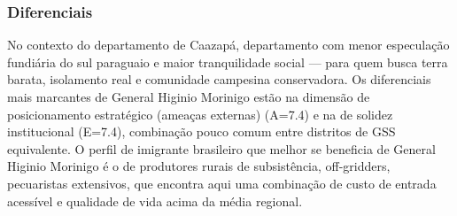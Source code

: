 \subsubsection*{Diferenciais}\label{dif-general-higinio-morinigo-0607}
No contexto do departamento de Caazapá, departamento com menor especulação fundiária do sul paraguaio e maior tranquilidade social — para quem busca terra barata, isolamento real e comunidade campesina conservadora. Os diferenciais mais marcantes de General Higinio Morinigo estão na dimensão de posicionamento estratégico (ameaças externas) (A=7.4) e na de solidez institucional (E=7.4), combinação pouco comum entre distritos de GSS equivalente. O perfil de imigrante brasileiro que melhor se beneficia de General Higinio Morinigo é o de produtores rurais de subsistência, off-gridders, pecuaristas extensivos, que encontra aqui uma combinação de custo de entrada acessível e qualidade de vida acima da média regional.
